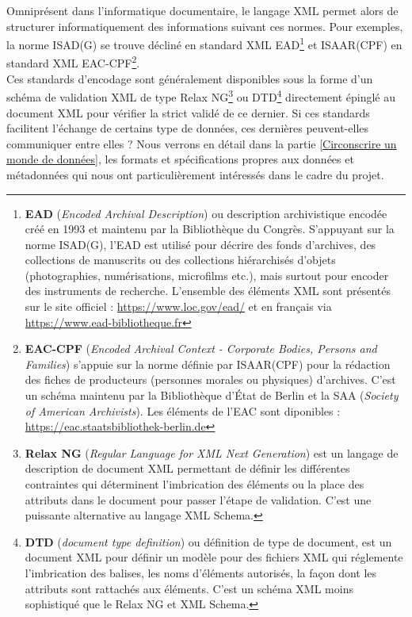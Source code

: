 Omniprésent dans l'informatique documentaire, le langage XML permet alors de structurer informatiquement des informations suivant ces normes. Pour exemples, la norme ISAD(G) se trouve décliné en standard XML EAD\footnote{\textbf{EAD} (\textit{Encoded Archival Description}) ou description archivistique encodée créé en 1993 et maintenu par la Bibliothèque du Congrès. S'appuyant sur la norme ISAD(G), l'EAD est utilisé pour décrire des fonds d'archives, des collections de manuscrits ou des collections hiérarchisés d'objets (photographies, numérisations, microfilms etc.), mais surtout pour encoder des instruments de recherche. L'ensemble des éléments XML sont présentés sur le site officiel : \url{https://www.loc.gov/ead/} et en français via \url{https://www.ead-bibliotheque.fr}} et ISAAR(CPF) en standard XML EAC-CPF\footnote{\textbf{EAC-CPF} (\textit{Encoded Archival Context - Corporate Bodies, Persons and Families}) s'appuie sur la norme définie par ISAAR(CPF) pour la rédaction des fiches de producteurs (personnes morales ou physiques) d'archives. C'est un schéma maintenu par la Bibliothèque d'État de Berlin et la SAA (\textit{Society of American Archivists}). Les éléments de l'EAC sont diponibles : \url{https://eac.staatsbibliothek-berlin.de}}.\\

Ces standards d'encodage sont généralement disponibles sous la forme d'un schéma de validation XML de type Relax NG\footnote{\textbf{Relax NG} (\textit{Regular Language for XML Next Generation}) est un langage de description de document XML permettant de définir les différentes contraintes qui déterminent l'imbrication des éléments ou la place des attributs dans le document pour passer l'étape de validation. C'est une puissante alternative au langage XML Schema.} ou DTD\footnote{\textbf{DTD} (\textit{document type definition}) ou définition de type de document, est un document XML pour définir un modèle pour des fichiers XML qui réglemente l'imbrication des balises, les noms d'éléments autorisés, la façon dont les attributs sont rattachés aux éléments. C'est un schéma XML moins sophistiqué que le Relax NG et XML Schema.} directement épinglé au document XML pour vérifier la strict validé de ce dernier. 
Si ces standards facilitent l'échange de certains type de données, ces dernières peuvent-elles communiquer entre elles ? Nous verrons en détail dans la partie \ref{Circonscrire un monde de données}, les formats et spécifications propres aux données et métadonnées qui nous ont particulièrement intéressés dans le cadre du projet.\\ 

